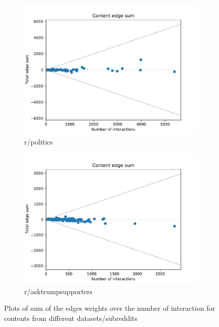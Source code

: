 \begin{figure}
\begin{center}
		\begin{subfigure}[b]{0.4\textwidth}
			\centering
			\includegraphics[width=\textwidth]{tex/out/politics200/edge-sum-n-interactions.pdf}
			\caption{r/politics}
			\label{fig:tex/out/cats200/edge-sum-n-interactions.pdf}
		\end{subfigure}
		\begin{subfigure}[b]{0.4\textwidth}
			\centering
			\includegraphics[width=\textwidth]{tex/out/asktrumpsupporters200/edge-sum-n-interactions.pdf}
			\caption{r/asktrumpsupporters}
			\label{fig:tex/out/covid19200/edge-sum-n-interactions.pdf}
		\end{subfigure}
	\end{center}
	\caption[Sum edges over number of interactions for many datasets]{Plots of
		sum of the edges weights over the number of interaction for contents
		from different datasets/subreddits}
	\label{fig:edge-sum-n-interactions}
\end{figure}

